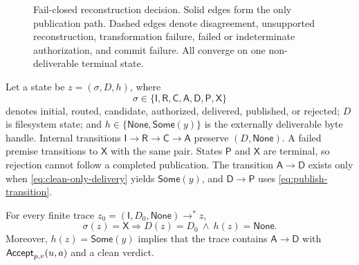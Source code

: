 \begin{figure}[t]
{%
}
\caption{Fail-closed reconstruction decision. Solid edges form the only
publication path. Dashed edges denote disagreement, unsupported reconstruction,
transformation failure, failed or indeterminate authorization, and commit
failure. All converge on one non-deliverable terminal state.}
\label{fig:reconstruct-or-reject}
\end{figure}

\begin{definition}
\label{def:operational-system}
Let a state be \(z=(\sigma,D,h)\), where
\[
 \sigma\in\{\mathsf I,\mathsf R,\mathsf C,\mathsf A,
 \mathsf D,\mathsf P,\mathsf X\}
\]
denotes initial, routed, candidate, authorized, delivered, published, or
rejected; \(D\) is filesystem state; and \(h\in\{\mathsf{None},
\mathsf{Some}(y)\}\) is the externally deliverable byte handle. Internal
transitions \(\mathsf I\to\mathsf R\to\mathsf C\to\mathsf A\) preserve
\((D,\mathsf{None})\). A failed premise transitions to \(\mathsf X\) with the
same pair. States \(\mathsf P\) and \(\mathsf X\) are terminal, so rejection
cannot follow a completed publication. The transition \(\mathsf A\to\mathsf D\) exists only when
\cref{eq:clean-only-delivery} yields \(\mathsf{Some}(y)\), and
\(\mathsf D\to\mathsf P\) uses \cref{eq:publish-transition}.
\end{definition}

\begin{proposition}
\label{prop:fail-closed-trace}
For every finite trace
\(z_0=(\mathsf I,D_0,\mathsf{None})\to^{*}z\),
\begin{equation}
 \sigma(z)=\mathsf X\Longrightarrow
 D(z)=D_0\ \land\ h(z)=\mathsf{None}.
 \label{eq:fail-closed-trace}
\end{equation}
Moreover, \(h(z)=\mathsf{Some}(y)\) implies that the trace contains
\(\mathsf A\to\mathsf D\) with \(\mathsf{Accept}_{p,v}(u,a)\) and a clean verdict.
\end{proposition}

